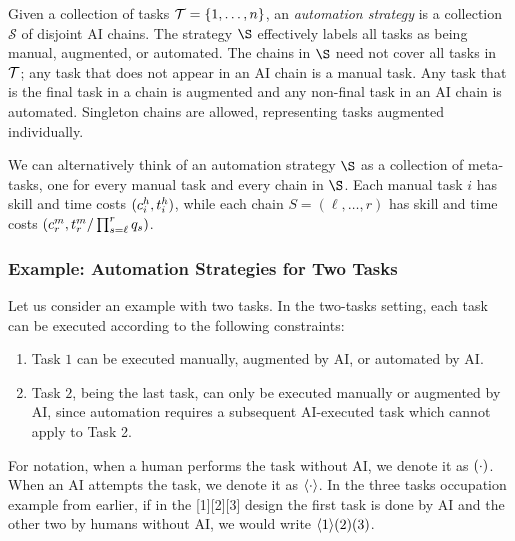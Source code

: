 \documentclass{article}
\theoremstyle{plain}
\theoremstyle{plain}
\begin{document}
Given a collection of tasks $\mathcal{T} = \{1, \dotsc, n\}$, an \emph{automation strategy} is a collection $\mathcal{S}$ of disjoint AI chains.  The strategy $\S$ effectively labels all tasks as being manual, augmented, or automated.  The chains in $\S$ need not cover all tasks in $\mathcal{T}$; any task that does not appear in an AI chain is a manual task.  Any task that is the final task in a chain is augmented and any non-final task in an AI chain is automated.  Singleton chains are allowed, representing tasks augmented individually.

We can alternatively think of an automation strategy $\S$ as a collection of meta-tasks, one for every manual task and every chain in $\S$.  Each manual task $i$ has skill and time costs $(c^{h}_{i}, t^{h}_{i})$, while each chain $S = (\ell, \dotsc, r)$ has skill and time costs $(c^{m}_{r}, t^{m}_{r}/\prod_{s=\ell}^{r}q_s)$.

\subsubsection{Example: Automation Strategies for Two Tasks}

Let us consider an example with two tasks.  In the two-tasks setting, each task can be executed according to the following constraints:
\begin{enumerate}
\item Task $1$ can be executed manually, augmented by AI, or automated by AI.
\item Task $2$, being the last task, can only be executed manually or augmented by AI, since automation requires a subsequent AI-executed task which cannot apply to Task 2.
\end{enumerate}

For notation, when a human performs the task without AI, we denote it as $( \cdot )$.
When an AI attempts the task, we denote it as $\langle \cdot \rangle$.
In the three tasks occupation example from earlier, if in the [1][2][3] design the first task is done by AI and the other two by humans without AI, we would write $\langle 1 \rangle( 2 )( 3 )$.
\end{document}
